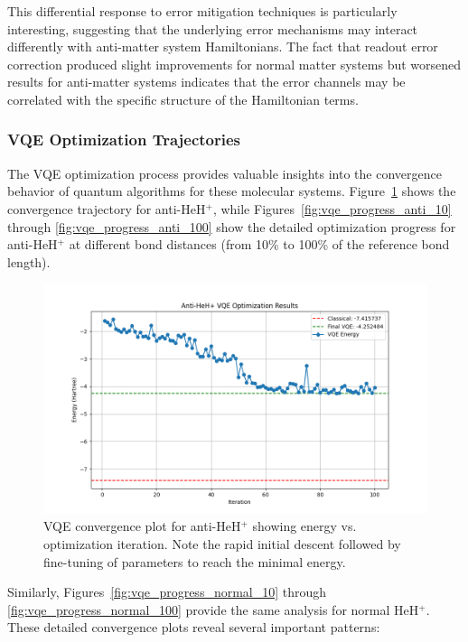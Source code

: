 \documentclass[10pt,twocolumn,a4paper]{article}
\begin{document}
This differential response to error mitigation techniques is particularly interesting, suggesting that the underlying error mechanisms may interact differently with anti-matter system Hamiltonians. The fact that readout error correction produced slight improvements for normal matter systems but worsened results for anti-matter systems indicates that the error channels may be correlated with the specific structure of the Hamiltonian terms.

\subsubsection{VQE Optimization Trajectories}
The VQE optimization process provides valuable insights into the convergence behavior of quantum algorithms for these molecular systems. Figure~\ref{fig:vqe_convergence_anti} shows the convergence trajectory for anti-HeH$^+$, while Figures~\ref{fig:vqe_progress_anti_10} through \ref{fig:vqe_progress_anti_100} show the detailed optimization progress for anti-HeH$^+$ at different bond distances (from 10\% to 100\% of the reference bond length).

\begin{figure}[t!]
    \centering
    \includegraphics[width=\columnwidth]{graphs/vqe_final_anti_heh+.png}
    \caption{VQE convergence plot for anti-HeH$^+$ showing energy vs. optimization iteration. Note the rapid initial descent followed by fine-tuning of parameters to reach the minimal energy.}
    \label{fig:vqe_convergence_anti}
\end{figure}

Similarly, Figures~\ref{fig:vqe_progress_normal_10} through \ref{fig:vqe_progress_normal_100} provide the same analysis for normal HeH$^+$. These detailed convergence plots reveal several important patterns:
\end{document}
